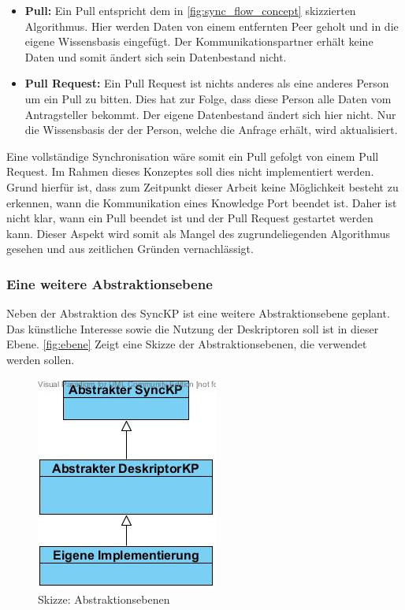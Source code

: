 \documentclass[a4paper]{article}
\begin{document}
	\begin{itemize}
		\item \textbf{Pull:} Ein Pull entspricht dem in
		\autoref{fig:sync_flow_concept} skizzierten Algorithmus. Hier werden
		Daten von einem entfernten Peer geholt und in die eigene Wissensbasis
		eingefügt. Der Kommunikationspartner erhält keine Daten und somit ändert
		sich sein Datenbestand nicht.
		\item \textbf{Pull Request:} Ein Pull Request ist nichts anderes als eine
		anderes Person um ein Pull zu bitten. Dies hat zur Folge, dass diese
		Person alle Daten vom Antragsteller bekommt. Der eigene Datenbestand 
		ändert sich hier nicht. Nur die Wissensbasis der der Person, welche die
		Anfrage erhält, wird aktualisiert.	
	\end{itemize} 
	
	Eine vollständige Synchronisation wäre somit ein Pull gefolgt von einem
	Pull Request. Im Rahmen dieses Konzeptes soll dies nicht implementiert werden.
	Grund hierfür ist, dass zum	Zeitpunkt dieser Arbeit keine Möglichkeit besteht 
	zu erkennen, wann die Kommunikation eines Knowledge Port beendet ist. 
	Daher ist nicht klar, wann ein Pull beendet ist und der Pull Request gestartet 
	werden kann. Dieser Aspekt wird somit als Mangel des zugrundeliegenden
	Algorithmus gesehen und aus zeitlichen Gründen vernachlässigt.
	
	\subsubsection{Eine weitere Abstraktionsebene}	
	
	Neben der Abstraktion des SyncKP ist eine weitere Abstraktionsebene geplant.
	Das künstliche Interesse sowie die Nutzung der Deskriptoren soll ist in
	dieser Ebene. \autoref{fig:ebene} Zeigt eine Skizze der Abstraktionsebenen,
	die verwendet werden sollen.
	
	\begin{figure}[H]
		\centerline{
			\includegraphics[scale=0.6]{../Bilder/ebene.jpg}
		}
		\caption{Skizze: Abstraktionsebenen}
		\label{fig:ebene}
	\end{figure}	
	
\end{document}
